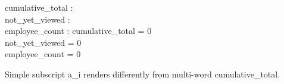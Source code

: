 \documentclass[a4paper,10pt,fleqn]{article}
\begin{document}
\begin{axdef}
cumulative\_total : \nat \\
not\_yet\_viewed : \nat \\
employee\_count : \nat
\where
cumulative\_total = 0 \land \\
\quad not\_yet\_viewed = 0 \land \\
\quad employee\_count = 0
\end{axdef}

\noindent Simple subscript a\_i renders differently from multi-word cumulative\_total.

\bigskip
\end{document}
